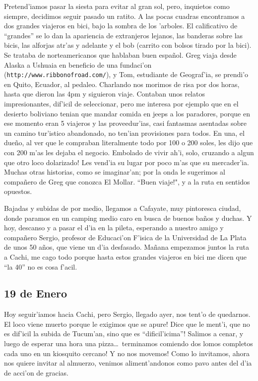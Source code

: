 Pretend'iamos pasar la siesta para evitar al gran sol, pero, inquietos como
siempre, decidimos seguir pasado un ratito. A las pocas cuadras encontramos a
dos grandes viajeros en bici, bajo la sombra de los 'arboles. El calificativo de
``grandes'' se lo dan la apariencia de extranjeros lejanos, las banderas sobre
las bicis, las alforjas atr'as y adelante y el bob (carrito con bolsos tirado
por la bici). Se trataba de norteamericanos que hablaban buen espa\~nol. Greg
viaja desde Alaska a Ushuaia en beneficio de una fundaci'on
(\texttt{http://www.ribbonofroad.com/}), y Tom, estudiante de Geograf'ia, se
prendi'o en Quito, Ecuador, al pedaleo. Charlando nos morimos de risa por dos
horas, hasta que dieron las 4pm y siguieron viaje. Contaban unos relatos
impresionantes, dif'icil de seleccionar, pero me interesa por ejemplo que en el
desierto boliviano tenian que mandar comida en jeeps a los paradores, porque en
ese momento eran 5 viajeros y las proveedur'ias, casi fantasmas asentadas sobre
un camino tur'istico abandonado, no ten'ian provisiones para todos. En una, el
due\~no, al ver que le compraban literalmente todo por 100 o 200 soles, les dijo
que con 200 m'as les dejaba el negocio. \textexclamdown Embolado de vivir ah'i,
solo, cruzando a algun que otro loco dolarizado! Les vend'ia su lugar por poco
m'as que su mercader'ia. Muchas otras historias, como se imaginar'an; por la
onda le sugerimos al compa\~nero de Greg que conozca El Mollar.
``\textexclamdown Buen viaje!", y a la ruta en sentidos opuestos.

Bajadas y subidas de por medio, llegamos a Cafayate, muy pintoresca ciudad,
donde paramos en un camping medio caro en busca de buenos ba\~nos y duchas. Y
hoy, descanso y a pasar el d'ia en la pileta, esperando a nuestro amigo y
compa\~nero Sergio, profesor de Educaci'on F'isica de la Universidad de La Plata
de unos 50 a\~nos, que viene un d'ia desfasado. Ma\~nana empezamos juntos la
ruta a Cachi, me cago todo porque hasta estos grandes viajeros en bici me dicen
que ``la 40'' no es cosa f'acil.

\subsection*{19 de Enero}

Hoy seguir'iamos hacia Cachi, pero Sergio, llegado ayer, nos tent'o de
quedarnos. \textexclamdown El loco viene muerto porque le exigimos que se apure!
Dice que le ment'i, que no es dif'icil la subida de Tucum'an, \textexclamdown
sino que es ``dificil'icima''! Salimos a cenar, y luego de esperar una hora una
pizza\ldots\ \textexclamdown terminamos comiendo dos lomos completos cada uno en
un kiosquito cercano! \textexclamdown Y no nos movemos! Como lo invitamos, ahora
nos quiere invitar al almuerzo, venimos aliment'andonos como pavo antes del d'ia
de acci'on de gracias.

